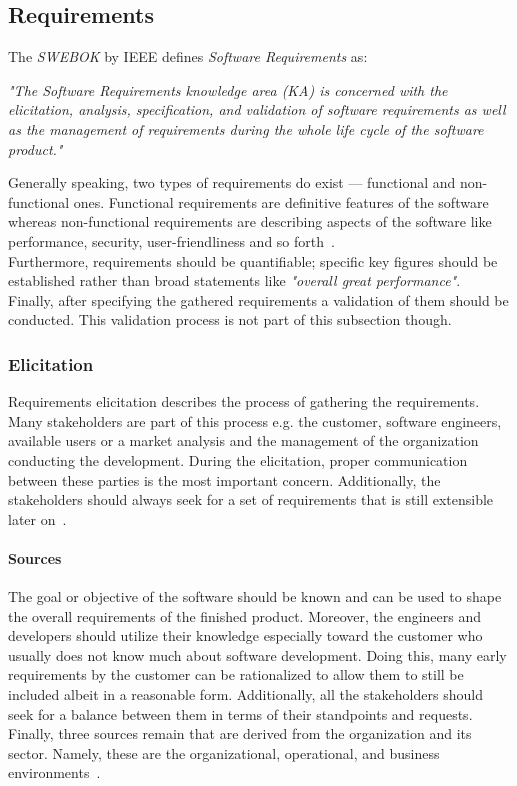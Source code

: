 \documentclass[12pt,a4paper]{report}
\begin{document}
\subsection{Requirements} \label{subsect:requirements}

The \textit{SWEBOK} by IEEE defines \textit{Software Requirements} as:
\begin{displayquote}
\emph{"The Software Requirements knowledge area (KA) is concerned with
the elicitation, analysis, specification, and validation of software requirements
as well as the management of requirements during the whole
life cycle of the software product."}~\cite{swebok}
\end{displayquote}
Generally speaking, two types of requirements do exist --- functional and non-functional ones.
Functional requirements are definitive features of the software whereas non-functional
requirements are describing aspects of the software like performance, security,
user-friendliness and so forth~\cite{sommerville-se}.\\
Furthermore, requirements should be quantifiable; specific key figures should be established
rather than broad statements like \textit{"overall great performance"}.\\
Finally, after specifying the gathered requirements a validation of them should be conducted.
This validation process is not part of this subsection though.


\subsubsection{Elicitation}
Requirements elicitation describes the process of gathering the requirements.
Many stakeholders are part of this process e.g. the customer, software engineers,
available users or a market analysis and the management of the organization conducting
the development.
During the elicitation, proper communication between these parties is the most important
concern. Additionally, the stakeholders should always seek for a set of
requirements that is still extensible later on~\cite{swebok}.

\paragraph{Sources}
The goal or objective of the software should be known and can be used to
shape the overall requirements of the finished product.
Moreover, the engineers and developers should utilize their knowledge especially
toward the customer who usually does not know much about software development.
Doing this, many early requirements by the customer can be rationalized to allow
them to still be included albeit in a reasonable form.
Additionally, all the stakeholders should seek for a balance between them in
terms of their standpoints and requests.\\
Finally, three sources remain that are derived from the organization and its sector.
Namely, these are the organizational, operational, and business environments~\cite{swebok}.
\end{document}
